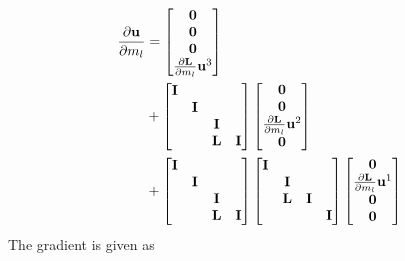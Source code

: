 \documentclass[revised,endfloat]{geophysics}
\begin{document}
\begin{equation}
\begin{split}
\frac{\partial {\bf u}}{\partial m_l} &= 
\begin{bmatrix}
{\bf 0} \\
{\bf 0} \\
{\bf 0} \\
{ \frac{\partial {\bf L}}{\partial m_l} {\bf u}^3} \\
\end{bmatrix}                  \\
&+ \begin{bmatrix}
{\bf I} & & & \\
 & {\bf I} & & \\
 & &  {\bf I}& \\
 & & {\bf L}& {\bf I} \\
\end {bmatrix}
\begin{bmatrix}
{\bf 0} \\
{\bf 0} \\
{\frac{\partial {\bf L}}{\partial m_l} {\bf u}^2} \\
{\bf 0} \\
\end{bmatrix}    \\
&+ \begin{bmatrix}
{\bf I} & & & \\
 & {\bf I} & & \\
 & &  {\bf I}& \\
 & & {\bf L}& {\bf I} \\
\end {bmatrix}
\begin{bmatrix}
{\bf I} & & & \\
 & {\bf I} & & \\
 & {\bf L} &  {\bf I}& \\
 & & & {\bf I} \\
\end {bmatrix}
\begin{bmatrix}
{\bf 0} \\
{\frac{\partial {\bf L}}{\partial m_l} {\bf u}^1} \\
{\bf 0} \\
{\bf 0} \\
\end{bmatrix}    \\
\end{split}
\label{eq56}
\end{equation}
The gradient is given as
\end{document}
